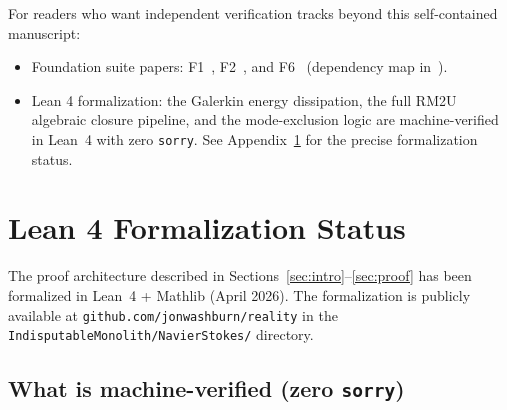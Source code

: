 \documentclass[12pt, reqno]{amsart}
\theoremstyle{definition}
\theoremstyle{remark}
\numberwithin{equation}{section}
\begin{document}
For readers who want independent verification tracks beyond this
self-contained manuscript:
\begin{itemize}[leftmargin=2em]
\item Foundation suite papers:
F1~\cite{F1JCost}, F2~\cite{F2Frustration}, and F6~\cite{F6Veto}
(dependency map in~\cite{FSPlan}).
\item Lean 4 formalization: the Galerkin energy dissipation, the full
RM2U algebraic closure pipeline, and the mode-exclusion logic are
machine-verified in Lean~4 with zero \texttt{sorry}.
See Appendix~\ref{app:lean} for the precise formalization status.
\end{itemize}


\appendix
\section{Lean 4 Formalization Status}\label{app:lean}

The proof architecture described in Sections~\ref{sec:intro}--\ref{sec:proof}
has been formalized in Lean~4 + Mathlib (April 2026).  The formalization
is publicly available at \texttt{github.com/jonwashburn/reality} in the
\texttt{IndisputableMonolith/NavierStokes/} directory.

\subsection{What is machine-verified (zero \texttt{sorry})}
\end{document}
